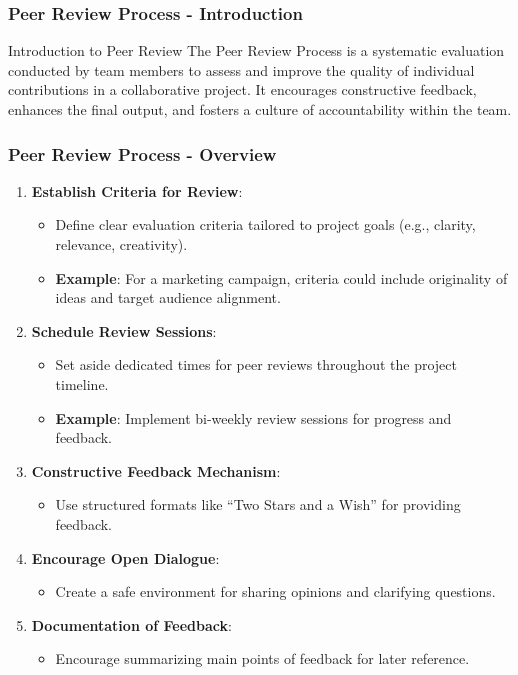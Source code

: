 \documentclass[aspectratio=169]{beamer}
\begin{document}
\begin{frame}[fragile]
    \frametitle{Peer Review Process - Introduction}
    \begin{block}{Introduction to Peer Review}
        The Peer Review Process is a systematic evaluation conducted by team members to assess and improve the quality of individual contributions in a collaborative project.
        It encourages constructive feedback, enhances the final output, and fosters a culture of accountability within the team.
    \end{block}
\end{frame}

\begin{frame}[fragile]
    \frametitle{Peer Review Process - Overview}
    \begin{enumerate}
        \item \textbf{Establish Criteria for Review}:
            \begin{itemize}
                \item Define clear evaluation criteria tailored to project goals (e.g., clarity, relevance, creativity).
                \item \textbf{Example}: For a marketing campaign, criteria could include originality of ideas and target audience alignment.
            \end{itemize}
        
        \item \textbf{Schedule Review Sessions}:
            \begin{itemize}
                \item Set aside dedicated times for peer reviews throughout the project timeline.
                \item \textbf{Example}: Implement bi-weekly review sessions for progress and feedback.
            \end{itemize}
        
        \item \textbf{Constructive Feedback Mechanism}:
            \begin{itemize}
                \item Use structured formats like “Two Stars and a Wish” for providing feedback.
            \end{itemize}
        
        \item \textbf{Encourage Open Dialogue}:
            \begin{itemize}
                \item Create a safe environment for sharing opinions and clarifying questions.
            \end{itemize}
        
        \item \textbf{Documentation of Feedback}:
            \begin{itemize}
                \item Encourage summarizing main points of feedback for later reference.
            \end{itemize}
    \end{enumerate}
\end{frame}
\end{document}
